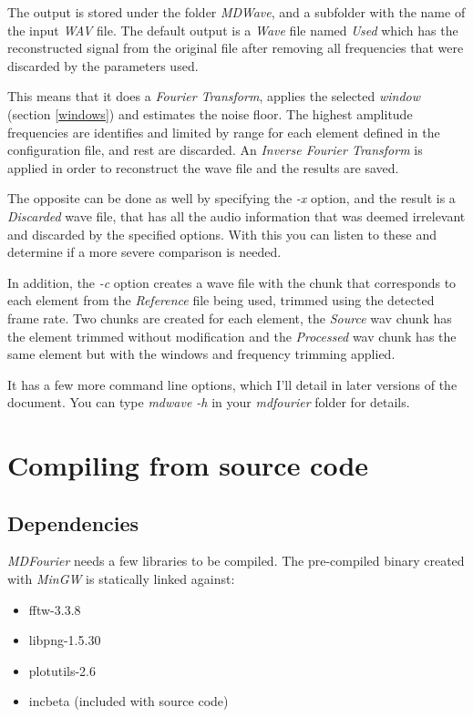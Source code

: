 \documentclass[10pt,a4paper]{report}
\begin{document}
The output is stored under the folder \textit{MDWave}, and a subfolder with the name of the input \textit{WAV} file. The default output is a \textit{Wave} file named \textit{Used} which has the reconstructed signal from the original file after removing all frequencies that were discarded by the parameters used.

This means that it does a \textit{Fourier Transform}, applies the selected \textit{window} (section \ref{windows}) and estimates the noise floor. The highest amplitude frequencies are identifies and limited by range for each element defined in the configuration file, and rest are discarded. An \textit{Inverse Fourier Transform} is applied in order to reconstruct the wave file and the results are saved.

The opposite can be done as well by specifying the \textit{-x} option, and the result is a \textit{Discarded} wave file, that has all the audio information that was deemed irrelevant and discarded by the specified options. With this you can listen to these and determine if a more severe comparison is needed.

In addition, the \textit{-c} option creates a wave file with the chunk that corresponds to each element from the \textit{Reference} file being used, trimmed using the detected frame rate. Two chunks are created for each element, the \textit{Source} wav chunk has the element trimmed without modification and the \textit{Processed} wav chunk has the same element but with the windows and frequency trimming applied.

It has a few more command line options, which I'll detail in later versions of the document. You can type \textit{mdwave -h} in your \textit{mdfourier} folder for details.

\chapter{Compiling from source code}

\section{Dependencies}

\textit{MDFourier} needs a few libraries to be compiled. The pre-compiled binary created with \textit{MinGW}\cite{mingw} is statically linked against:

\begin{itemize}
	\item fftw-3.3.8\cite{fftw}
	\item libpng-1.5.30\cite{libpng}
	\item plotutils-2.6\cite{libplot}
	\item incbeta\cite{betafunction} (included with source code)
\end{itemize}
\end{document}
